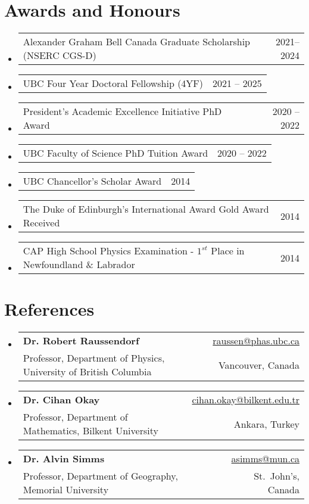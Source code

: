 \documentclass[letterpaper,11pt]{article}
\makeatletter
\newcommand{\AwardsItem}[2]{
	\item{\vspace{-1pt}
		\begin{tabular*}{0.97\textwidth}{l@{\extracolsep{\fill}}r}
			{#1} & {#2}
		\end{tabular*}
		\vspace{-5pt}
	}
}
\newcommand{\ReferencesItem}[4]{
	\item{\vspace{-1pt}
		\begin{tabular*}{0.97\textwidth}{l@{\extracolsep{\fill}}r}
			\textbf{#1} & {#2}\\
			{#3} & {#4}
		\end{tabular*}
		\vspace{-5pt}
	}
}
\makeatother
\begin{document}
\section*{Awards and Honours}
\begin{itemize}[leftmargin=*]
	\AwardsItem{Alexander Graham Bell Canada Graduate Scholarship (NSERC CGS-D)}{2021--2024}
	\AwardsItem{UBC Four Year Doctoral Fellowship (4YF)}{2021 -- 2025}
	\AwardsItem{President's Academic Excellence Initiative PhD Award}{2020 -- 2022}
	\AwardsItem{UBC Faculty of Science PhD Tuition Award }{2020 -- 2022}
	\AwardsItem{UBC Chancellor's Scholar Award}{2014}
	\AwardsItem{The Duke of Edinburgh's International Award Gold Award Received}{2014}
	\AwardsItem{CAP High School Physics Examination - $1^{st}$ Place in Newfoundland \& Labrador}{2014}
\end{itemize}


\section*{References}
\begin{itemize}[leftmargin=*]
	\ReferencesItem{Dr. Robert Raussendorf}{\href{mailto:raussen@phas.ubc.ca}{raussen@phas.ubc.ca}}{Professor, Department of Physics, University of British Columbia}{Vancouver, Canada}
	
	\ReferencesItem{Dr. Cihan Okay}{\href{mailto:cihan.okay@bilkent.edu.tr}{cihan.okay@bilkent.edu.tr}}{Professor, Department of Mathematics, Bilkent University}{Ankara, Turkey}
	
	\ReferencesItem{Dr. Alvin Simms}{\href{mailto:asimms@mun.ca}{asimms@mun.ca}}{Professor, Department of Geography, Memorial University}{St.~John's, Canada}
\end{itemize}
\end{document}
